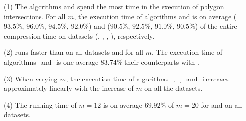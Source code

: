 {\ni(1) The algorithms \cist and \cista spend the most time in the execution of
polygon intersections. For all $m$, the execution time of algorithms \cpia and
\rpia is on average {($93.5\%$, $96.0\%$, $94.5\%$, $92.0\%$)
	and ($90.5\%$, $92.5\%$, $91.0\%$, $90.5\%$)} of the entire compression  time on {datasets}
(\sercar, \geolife, \mopsi, \pricar), respectively.

\ni(2) \rpia runs faster than \cpia on all datasets and for all $m$. The execution time of algorithms \cist-\rpia and \cista-\rpia is one average $83.74\%$ their counterparts with \cpia.

\ni(3) When varying $m$, the execution time of algorithms \cist-\rpia, \cist-\cpia, \cista-\rpia and \cista-\cpia increases approximately linearly with the increase of $m$ on all the datasets.

\ni(4) The running time of $m=12$ is on average $69.92\%$ of $m=20$ for \cist and \cista on all datasets.




}
